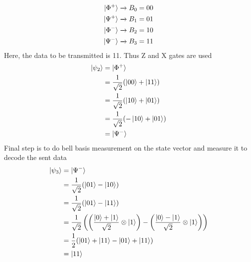 \documentclass[12pt]{article}
\begin{document}
  \begin{equation*}
    \begin{split}
      \ket{\Phi^+} \xrightarrow{} B_0 = 00\\
      \ket{\Psi^+} \xrightarrow{} B_1 = 01\\
      \ket{\Phi^-} \xrightarrow{} B_2 = 10\\
      \ket{\Psi^-} \xrightarrow{} B_3 = 11\\
    \end{split}
  \end{equation*}
  Here, the data to be transmitted is 11. Thus Z and X gates are used
  \begin{equation*}
    \begin{split}
      \ket{\psi_2} & = \ket{\Phi^+}\\
      & = \frac{1}{\sqrt{2}}(\ket{00} + \ket{11})\\
      & = \frac{1}{\sqrt{2}}(\ket{10} + \ket{01})\\
      & = \frac{1}{\sqrt{2}}(-\ket{10} + \ket{01})\\
      & = \ket{\Psi^-}
    \end{split}
  \end{equation*}
  Final step is to do bell basis measurement on the state vector and measure it to decode the sent data
  \begin{equation*}
    \begin{split}
      \ket{\psi_3} & = \ket{\Psi^-}\\
      & = \frac{1}{\sqrt{2}}(\ket{01} - \ket{10})\\
      & = \frac{1}{\sqrt{2}}(\ket{01} - \ket{11})\\
      & = \frac{1}{\sqrt{2}} \left( \left( \frac{\ket{0} + \ket{1}}{\sqrt{2}} \otimes \ket{1} \right) - \left( \frac{\ket{0} - \ket{1}}{\sqrt{2}} \otimes \ket{1} \right) \right)\\
      & = \frac{1}{2}(\ket{01} + \ket{11} - \ket{01} + \ket{11})\\
      & = \ket{11}
    \end{split}
  \end{equation*}  
\end{document}
